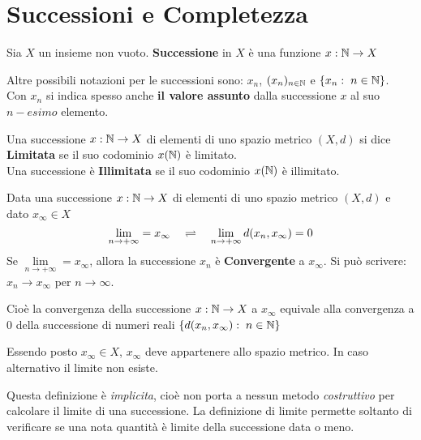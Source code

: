 \section{Successioni e Completezza}
\begin{definition}[Successione]
	Sia $X$ un insieme non vuoto. \textbf{Successione} in $X$ è una funzione $x: \mathbb{N} \to X$
	\begin{note}
		Altre possibili notazioni per le successioni sono: $x_n$, $(x_n)_{n \in \mathbb{N}}$ e $\left\{x_n:\; n \in \mathbb{N}\right\}$.\\
		Con $x_n$ si indica spesso anche \textbf{il valore assunto} dalla successione $x$ al suo $n-esimo$ elemento.
	\end{note}
\end{definition}
\begin{definition}
	Una successione $x: \mathbb{N} \to X$ di elementi di uno spazio metrico $(X,d)$ si dice \textbf{Limitata} se il suo codominio $x(\mathbb{N})$ è limitato.\\
	Una successione è \textbf{Illimitata} se il suo codominio $x(\mathbb{N})$ è illimitato.
\end{definition}
\begin{definition}[Limite per Successioni] %
	\label{def:lim_succ}
	Data una successione $x: \mathbb{N} \to X$ di elementi di uno spazio metrico $(X,d)$ e dato $x_\infty \in X$
	\[\lim\limits_{n \to +\infty} = x_\infty \quad \rightleftharpoons \quad \lim\limits_{n \to +\infty} d(x_n,x_\infty) = 0\]
	Se $\lim\limits_{n \to +\infty} = x_\infty$, allora la successione $x_n$ è \textbf{Convergente} a $x_\infty$. Si può scrivere: $x_n \to x_\infty$ per $n \to \infty$.

	Cioè la convergenza della successione $x: \mathbb{N} \to X$ a $x_\infty$ equivale alla convergenza a $0$ della successione di numeri reali $\left\{d(x_n,x_\infty):\; n \in \mathbb{N}\right\}$
	\begin{note}
		Essendo posto $x_\infty \in X$, $x_\infty$ deve appartenere allo spazio metrico. In caso alternativo il limite non esiste.
	\end{note}
	\begin{note}
		Questa definizione è \textit{implicita}, cioè non porta a nessun metodo \textit{costruttivo} per calcolare il limite di una successione. La definizione di limite permette soltanto di verificare se una nota quantità è limite della successione data o meno.
	\end{note}
\end{definition}

